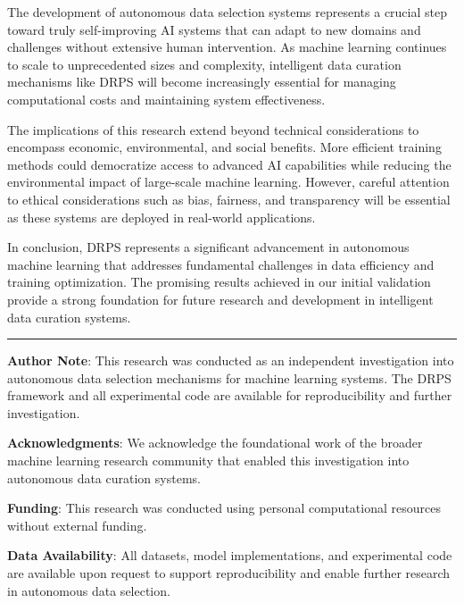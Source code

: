 \documentclass[12pt]{article}
\begin{document}
The development of autonomous data selection systems represents a crucial step toward truly self-improving AI systems that can adapt to new domains and challenges without extensive human intervention. As machine learning continues to scale to unprecedented sizes and complexity, intelligent data curation mechanisms like DRPS will become increasingly essential for managing computational costs and maintaining system effectiveness.

The implications of this research extend beyond technical considerations to encompass economic, environmental, and social benefits. More efficient training methods could democratize access to advanced AI capabilities while reducing the environmental impact of large-scale machine learning. However, careful attention to ethical considerations such as bias, fairness, and transparency will be essential as these systems are deployed in real-world applications.

In conclusion, DRPS represents a significant advancement in autonomous machine learning that addresses fundamental challenges in data efficiency and training optimization. The promising results achieved in our initial validation provide a strong foundation for future research and development in intelligent data curation systems.

\begin{center}\rule{0.5\linewidth}{0.5pt}\end{center}

\textbf{Author Note}: This research was conducted as an independent investigation into autonomous data selection mechanisms for machine learning systems. The DRPS framework and all experimental code are available for reproducibility and further investigation.

\textbf{Acknowledgments}: We acknowledge the foundational work of the broader machine learning research community that enabled this investigation into autonomous data curation systems.

\textbf{Funding}: This research was conducted using personal computational resources without external funding.

\textbf{Data Availability}: All datasets, model implementations, and experimental code are available upon request to support reproducibility and enable further research in autonomous data selection.
\end{document}
